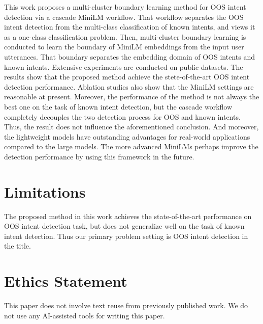 \documentclass[11pt]{article}
\begin{document}
This work proposes a multi-cluster boundary learning method for OOS intent detection via a cascade MiniLM workflow. That workflow separates the OOS intent detection from the multi-class classification of known intents, and views it as a one-class classification problem. Then, multi-cluster boundary learning is conducted to learn the boundary of MiniLM embeddings from the input user utterances. That boundary separates the embedding domain of OOS intents and known intents. Extensive experiments are conducted on public datasets. The results show that the proposed method achieve the stete-of-the-art OOS intent detection performance. Ablation studies also show that the MiniLM settings are reasonable at present. Moreover, the performance of the method is not always the best one on the task of known intent detection, but the cascade workflow completely decouples the two detection process for OOS and known intents. Thus, the result does not influence the aforementioned conclusion. And moreover, the lightweight models have outstanding advantages for real-world applications compared to the large models. The more advanced MiniLMs perhaps improve the detection performance by using this framework in the future.       




\section*{Limitations}
The proposed method in this work achieves the state-of-the-art performance on OOS intent detection task, but does not generalize well on the task of known intent detection. Thus our primary problem setting is OOS intent detection in the title. 

\section*{Ethics Statement}
This paper does not involve text reuse from previously published work. We do not use any AI-assisted tools for writing this paper.


\end{document}
